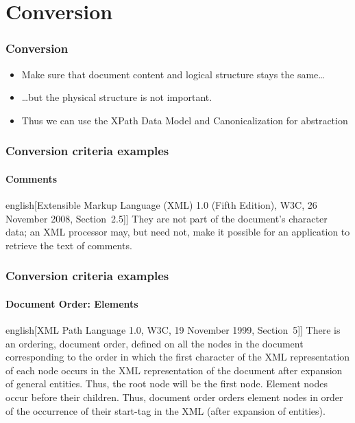 \documentclass[
    alternativetitlepage=alternativ,
    cornerlogo=hgi_nds_logo2,
    sectionoverview,
]{rubpresentation}
\begin{document}
\section{Conversion}

\begin{frame}
    \frametitle{Conversion}
    \begin{itemize}
        \item{} Make sure that document content and logical structure stays the same\dots{}
        \item{} \dots{}but the physical structure is not important.
        \item{} Thus we can use the XPath Data Model and Canonicalization for abstraction
    \end{itemize}
\end{frame}

\begin{frame}
    \frametitle{Conversion criteria examples}
    \framesubtitle{Comments}
    \begin{foreigndisplayquote}{english}[{Extensible Markup Language (XML) 1.0 (Fifth Edition), W3C, 26 November 2008, Section~2.5]}]
        They are not part of the document's character data; an XML processor may, but need not, make it possible for an application to retrieve the text of comments.
    \end{foreigndisplayquote}
\end{frame}

\begin{frame}
    \frametitle{Conversion criteria examples}
    \framesubtitle{Document Order: Elements}
    \begin{foreigndisplayquote}{english}[{XML Path Language 1.0, W3C, 19 November 1999, Section~5]}]
There is an ordering, document order, defined on all the nodes in the document corresponding to the order in which the first character of the XML representation of each node occurs in the XML representation of the document after expansion of general entities. Thus, the root node will be the first node. Element nodes occur before their children. Thus, document order orders element nodes in order of the occurrence of their start-tag in the XML (after expansion of entities).
    \end{foreigndisplayquote}
\end{frame}
\end{document}
